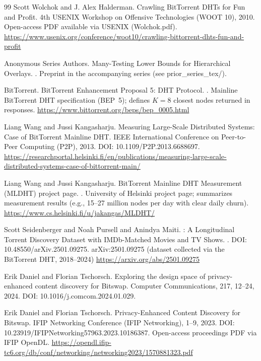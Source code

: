 \documentclass[11pt]{article}
\begin{document}
\begin{thebibliography}{99}
Scott Wolchok and J. Alex Halderman.
\newblock Crawling {BitTorrent} {DHTs} for Fun and Profit.
\newblock 4th USENIX Workshop on Offensive Technologies (WOOT 10), 2010.
\newblock Open-access PDF available via USENIX (Wolchok.pdf).
\newblock \url{https://www.usenix.org/conference/woot10/crawling-bittorrent-dhts-fun-and-profit}

Anonymous Series Authors.
\newblock Many-Testing Lower Bounds for Hierarchical Overlays.
.
\newblock Preprint in the accompanying series (see prior\_series\_tex/).

{BitTorrent}.
\newblock BitTorrent Enhancement Proposal 5: {DHT} Protocol.
.
\newblock Mainline BitTorrent DHT specification (BEP~5); defines $K=8$ closest nodes returned in responses.
\newblock \url{https://www.bittorrent.org/beps/bep_0005.html}

Liang Wang and Jussi Kangasharju.
\newblock Measuring Large-Scale Distributed Systems: Case of BitTorrent Mainline {DHT}.
\newblock IEEE International Conference on Peer-to-Peer Computing (P2P), 2013.
\newblock DOI: 10.1109/P2P.2013.6688697.
\newblock \url{https://researchportal.helsinki.fi/en/publications/measuring-large-scale-distributed-systems-case-of-bittorrent-main/}

Liang Wang and Jussi Kangasharju.
\newblock BitTorrent Mainline {DHT} Measurement (MLDHT) project page.
.
\newblock University of Helsinki project page; summarizes measurement results (e.g., 15--27 million nodes per day with clear daily churn).
\newblock \url{https://www.cs.helsinki.fi/u/jakangas/MLDHT/}

Scott Seidenberger and Noah Pursell and Anindya Maiti.
: A Longitudinal Torrent Discovery Dataset with IMDb-Matched Movies and TV Shows.
.
\newblock DOI: 10.48550/arXiv.2501.09275.
\newblock arXiv:2501.09275 (dataset collected via the BitTorrent DHT, 2018--2024)
\newblock \url{https://arxiv.org/abs/2501.09275}

Erik Daniel and Florian Tschorsch.
\newblock Exploring the design space of privacy-enhanced content discovery for Bitswap.
\newblock Computer Communications, 217, 12--24, 2024.
\newblock DOI: 10.1016/j.comcom.2024.01.029.

Erik Daniel and Florian Tschorsch.
\newblock Privacy-Enhanced Content Discovery for {Bitswap}.
\newblock IFIP Networking Conference (IFIP Networking), 1--9, 2023.
\newblock DOI: 10.23919/IFIPNetworking57963.2023.10186387.
\newblock Open-access proceedings PDF via IFIP OpenDL.
\newblock \url{https://opendl.ifip-tc6.org/db/conf/networking/networking2023/1570881323.pdf}


\end{thebibliography}
\end{document}
